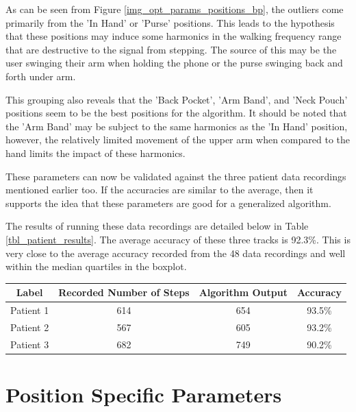             As can be seen from Figure \ref{img_opt_params_positions_bp}, the outliers come primarily from the 'In Hand' or 'Purse' positions. This leads to the hypothesis that these positions may induce some harmonics in the walking frequency range that are destructive to the signal from stepping. The source of this may be the user swinging their arm when holding the phone or the purse swinging back and forth under arm.

            This grouping also reveals that the 'Back Pocket', 'Arm Band', and 'Neck Pouch' positions seem to be the best positions for the algorithm. It should be noted that the 'Arm Band' may be subject to the same harmonics as the 'In Hand' position, however, the relatively limited movement of the upper arm when compared to the hand limits the impact of these harmonics.

            These parameters can now be validated against the three patient data recordings mentioned earlier too. If the accuracies are similar to the average, then it supports the idea that these parameters are good for a generalized algorithm.

            The results of running these data recordings are detailed below in Table \ref{tbl_patient_results}. The average accuracy of these three tracks is 92.3\%. This is very close to the average accuracy recorded from the 48 data recordings and well within the median quartiles in the boxplot.

            \begin{center}
                \label{tbl_patient_results}
                \begin{tabular}{|c|c|c|c|}
                    \hline
                    Label & Recorded Number of Steps & Algorithm Output & Accuracy \\
                    \hline
                    Patient 1 & 614 & 654 & 93.5\% \\ 
                    Patient 2 & 567 & 605 & 93.2\% \\
                    Patient 3 & 682 & 749 & 90.2\% \\
                    \hline
                \end{tabular}
            \end{center}

        \section{Position Specific Parameters}

